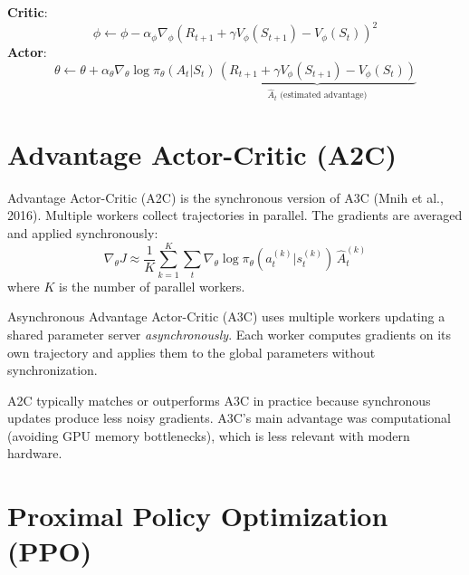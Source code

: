 \begin{keyformulas}[title=\textbf{Basic Actor-Critic Update}]
\textbf{Critic}:
\[
    \phi \leftarrow \phi - \alpha_\phi \nabla_\phi \left(
    R_{t+1} + \gamma V_\phi(S_{t+1}) - V_\phi(S_t) \right)^2
\]
\textbf{Actor}:
\[
    \theta \leftarrow \theta + \alpha_\theta \nabla_\theta
    \log \pi_\theta(A_t|S_t) \,
    \underbrace{\left(R_{t+1} + \gamma V_\phi(S_{t+1})
    - V_\phi(S_t)\right)}_{\hat{A}_t \text{ (estimated advantage)}}
\]
\end{keyformulas}

\section{Advantage Actor-Critic (A2C)}
\label{sec:a2c}

\begin{definition}[A2C]
Advantage Actor-Critic (A2C) is the synchronous version of A3C
(Mnih et al., 2016). Multiple workers collect trajectories in parallel.
The gradients are averaged and applied synchronously:
\[
    \nabla_\theta J \approx \frac{1}{K} \sum_{k=1}^{K}
    \sum_{t} \nabla_\theta \log \pi_\theta(a_t^{(k)} | s_t^{(k)}) \,
    \hat{A}_t^{(k)}
\]
where $K$ is the number of parallel workers.
\end{definition}

\begin{definition}[A3C]
Asynchronous Advantage Actor-Critic (A3C) uses multiple workers updating
a shared parameter server \emph{asynchronously}. Each worker computes
gradients on its own trajectory and applies them to the global parameters
without synchronization.
\end{definition}

\begin{remark}
A2C typically matches or outperforms A3C in practice because synchronous
updates produce less noisy gradients. A3C's main advantage was
computational (avoiding GPU memory bottlenecks), which is less relevant
with modern hardware.
\end{remark}

\section{Proximal Policy Optimization (PPO)}
\label{sec:ppo}

